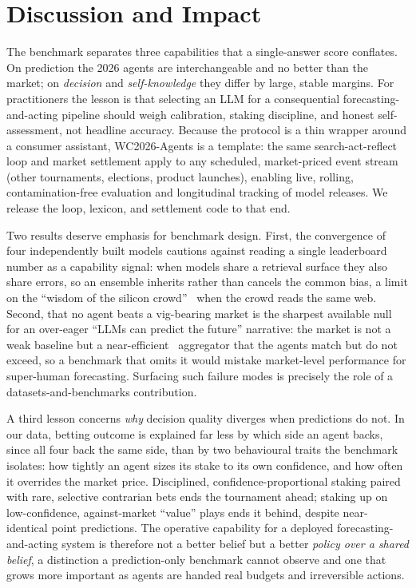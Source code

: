 \documentclass[sigconf,review]{acmart}
\begin{document}
\section{Discussion and Impact}
The benchmark separates three capabilities that a single-answer score conflates.
On prediction the 2026 agents are interchangeable and no better than the market;
on \emph{decision} and \emph{self-knowledge} they differ by large, stable
margins. For practitioners the lesson is that selecting an LLM for a
consequential forecasting-and-acting pipeline should weigh calibration, staking
discipline, and honest self-assessment, not headline accuracy. Because the
protocol is a thin wrapper around a consumer assistant, WC2026-Agents is a
template: the same search-act-reflect loop and market settlement apply to any
scheduled, market-priced event stream (other tournaments, elections, product
launches), enabling live, rolling, contamination-free evaluation and longitudinal
tracking of model releases. We release the loop, lexicon, and settlement code to
that end.

Two results deserve emphasis for benchmark design. First, the convergence of
four independently built models cautions against reading a single leaderboard
number as a capability signal: when models share a retrieval surface they also
share errors, so an ensemble inherits rather than cancels the common bias, a
limit on the ``wisdom of the silicon crowd''~\cite{schoenegger2024wisdom} when
the crowd reads the same web. Second, that no agent beats a vig-bearing market is
the sharpest available null for an over-eager ``LLMs can predict the future''
narrative: the market is not a weak baseline but a
near-efficient~\cite{fama1970efficient,strumbelj2014odds} aggregator that the
agents match but do not exceed, so a benchmark that omits it would mistake
market-level performance for super-human forecasting. Surfacing such failure
modes is precisely the role of a datasets-and-benchmarks contribution.

A third lesson concerns \emph{why} decision quality diverges when predictions do
not. In our data, betting outcome is explained far less by which side an agent
backs, since all four back the same side, than by two behavioural traits the
benchmark isolates: how tightly an agent sizes its stake to its own confidence,
and how often it overrides the market price. Disciplined, confidence-proportional
staking paired with rare, selective contrarian bets ends the tournament ahead;
staking up on low-confidence, against-market ``value'' plays ends it behind,
despite near-identical point predictions. The operative capability for a deployed
forecasting-and-acting system is therefore not a better belief but a better
\emph{policy over a shared belief}, a distinction a prediction-only benchmark
cannot observe and one that grows more important as agents are handed real
budgets and irreversible actions.
\end{document}
